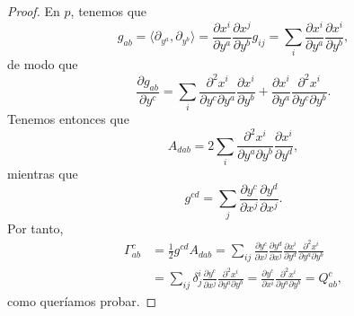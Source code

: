 \documentclass[11pt,a4paper]{amsbook}
\theoremstyle{remark} \newtheorem{rmk}[subsection]{Observación}
\theoremstyle{definition} \newtheorem{defn}[subsection]{Definición}
\theoremstyle{definition} \newtheorem{ex}[subsection]{Ejemplo}
\theoremstyle{definition} \newtheorem{ej}[subsection]{Ejercicio}
\begin{document}
\begin{proof}
En $p$, tenemos que
\begin{equation*}
g_{ab} = \langle \partial_{y^a},\partial_{y^b} \rangle = \frac{\partial x^i}{\partial y^a}\frac{\partial x^j}{\partial y^b} g_{ij} = \sum_i \frac{\partial x^i}{\partial y^a}\frac{\partial x^i}{\partial y^b},
\end{equation*}
de modo que
\begin{equation*}
\frac{\partial g_{ab}}{\partial y^c} = \sum_i \frac{\partial^2 x^i}{\partial y^c \partial y^a}\frac{\partial x^i}{\partial y^b} + \frac{\partial x^i}{\partial y^a}\frac{\partial^2 x^i}{\partial y^c \partial y^b}.
\end{equation*}
Tenemos entonces que
\begin{equation*}
A_{dab} = 2 \sum_i \frac{\partial^2 x^i}{\partial y^a \partial y^b} \frac{\partial x^i}{\partial y^d},
\end{equation*}
mientras que
\begin{equation*}
g^{cd} = \sum_j \frac{\partial y^c}{\partial x^j} \frac{\partial y^d}{\partial x^j}.
\end{equation*}
Por tanto,
\begin{align*}
\Gamma^c_{ab} &= \frac{1}{2} g^{cd} A_{dab} = \sum_{ij} \frac{\partial y^c}{\partial x^j} \frac{\partial y^d}{\partial x^j}\frac{\partial x^i}{\partial y^d}\frac{\partial^2 x^i}{\partial y^a \partial y^b} \\ &= \sum_{ij} \delta^i_j \frac{\partial y^c}{\partial x^j}\frac{\partial^2 x^i}{\partial y^a \partial y^b} = \frac{\partial y^c}{\partial x^i}\frac{\partial^2 x^i}{\partial y^a \partial y^b}=Q^c_{ab},
\end{align*}
como queríamos probar.
\end{proof}
\end{document}
